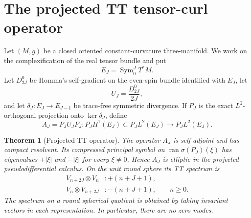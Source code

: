 \documentclass[11pt]{article}
\newtheorem{theorem}{Theorem}[section]
\theoremstyle{definition}
\DeclareMathOperator{\Sym}{Sym}
\begin{document}
\section{The projected TT tensor-curl operator}
\label{sec:operator}

Let $(M,g)$ be a closed oriented constant-curvature three-manifold.  We work
on the complexification of the real tensor bundle and put
\[
 E_J=\Sym^J_0T^*M.
\]
Let $D^0_{2J}$ be Homma's self-gradient on the even-spin bundle identified
with $E_J$, let
\[
 U_J=\frac{D^0_{2J}}{2J},
\]
and let $\delta_J:E_J\to E_{J-1}$ be trace-free symmetric divergence.  If
$P_J$ is the exact $L^2$-orthogonal projection onto $\ker\delta_J$, define
\begin{equation}
 A_J=P_JU_JP_J:
 P_JH^1(E_J)\subset P_JL^2(E_J)\longrightarrow P_JL^2(E_J).
 \label{eq:AJ}
\end{equation}

\begin{theorem}[Projected TT operator]
\label{thm:tt-operator}
The operator $A_J$ is self-adjoint and has compact resolvent.  Its compressed
principal symbol on $\operatorname{ran}\sigma(P_J)(\xi)$ has eigenvalues
$+|\xi|$ and $-|\xi|$ for every $\xi\neq0$.  Hence $A_J$ is elliptic in the
projected pseudodifferential calculus.  On the unit round sphere its TT
spectrum is
\begin{align}
 V_{n+2J}\otimes V_n &: +(n+J+1),\nonumber\\
 V_n\otimes V_{n+2J} &: -(n+J+1),
 \qquad n\geq0.
 \label{eq:sphere-spectrum}
\end{align}
The spectrum on a round spherical quotient is obtained by taking invariant
vectors in each representation.  In particular, there are no zero modes.
\end{theorem}
\end{document}

